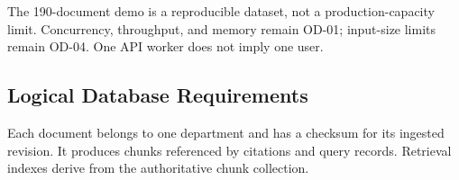 \documentclass[11pt,letterpaper]{article}
\begin{document}
\endgroup

The 190-document demo is a reproducible dataset, not a production-capacity limit. Concurrency, throughput, and memory remain OD-01; input-size limits remain OD-04. One API worker does not imply one user.\par

\subsection{Logical Database Requirements}

Each document belongs to one department and has a checksum for its ingested revision. It produces chunks referenced by citations and query records. Retrieval indexes derive from the authoritative chunk collection.\par

\begingroup\small
\end{document}
